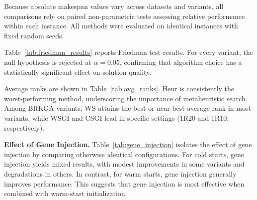 \documentclass[sigconf]{acmart}
\begin{document}
Because absolute makespan values vary across datasets and variants, all comparisons rely on paired non-parametric tests assessing relative performance within each instance. All methods were evaluated on identical instances with fixed random seeds.

Table~\ref{tab:friedman_results} reports Friedman test results. For every variant, the null hypothesis is rejected at $\alpha=0.05$, confirming that algorithm choice has a statistically significant effect on solution quality.

Average ranks are shown in Table~\ref{tab:avg_ranks}. Heur is consistently the worst-performing method, underscoring the importance of metaheuristic search. Among BRKGA variants, WS attains the best or near-best average rank in most variants, while WSGI and CSGI lead in specific settings (1R20 and 1R10, respectively).

\textbf{Effect of Gene Injection.} Table~\ref{tab:gene_injection} isolates the effect of gene injection by comparing otherwise identical configurations. For cold starts, gene injection yields mixed results, with modest improvements in some variants and degradations in others. In contrast, for warm starts, gene injection generally improves performance. This suggests that gene injection is most effective when combined with warm-start initialization.







\end{document}
